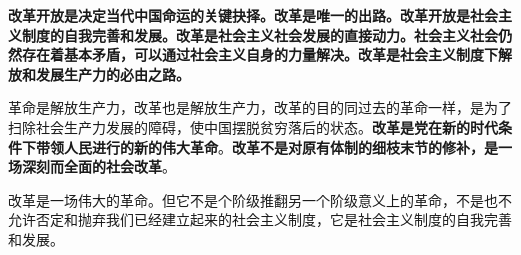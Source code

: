 \textbf{{改革开放是决定当代中国命运的关键抉择。改革是唯一的出路。改革开放是社会主义制度的自我完善和发展。改革是社会主义社会发展的直接动力{。}}{社会主义社会仍然存在着基本矛盾，可以通过社会主义自身的力量解决。改革是社会主义制度下解放和发展生产力的必由之路。}}

{革命是解放生产力，改革也是解放生产力，改革的目的同过去的革命一样，是为了扫除社会生产力发展的障碍，使中国摆脱贫穷落后的状态}。\textbf{{改革是党在新的时代条件下带领人民进行的新的伟大革命}}{。}\textbf{{改革不是对原有体制的细枝末节的修补，是一场深刻而全面的社会改革}}。

{改革是一场伟大的革命。但它}{不是个阶级推翻另一个阶级意义上的革命，不是也不允许否定和抛弃我们已经建立起来的社会主义制度}{，它是社会主义制度的自我完善和发展。}
